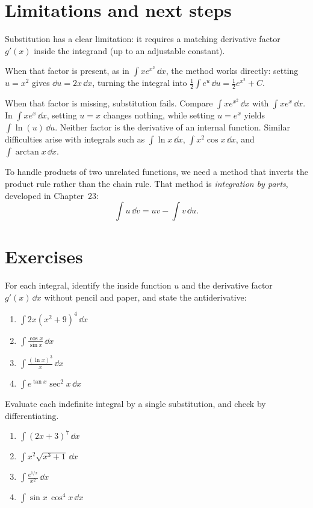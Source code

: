 \section{Limitations and next steps}

\begin{connectionbox}
Substitution has a clear limitation: it requires a matching
derivative factor $g'(x)$ inside the integrand (up to an adjustable constant).

When that factor is present, as in $\int x e^{x^2}\,\dd x$, the method works directly:
setting $u = x^2$ gives $\dd u = 2x\,\dd x$, turning the integral into
$\frac{1}{2}\int e^u\,\dd u = \frac{1}{2}e^{x^2} + C$.

When that factor is missing, substitution fails. Compare $\int x e^{x^2}\,\dd x$ with
$\int x e^x\,\dd x$. In $\int x e^x\,\dd x$, setting $u = x$ changes nothing, while
setting $u = e^x$ yields $\int \ln(u)\,\dd u$. Neither factor is the derivative of an
internal function. Similar difficulties arise with integrals such as $\int \ln x\,\dd x$,
$\int x^2\cos x\,\dd x$, and $\int \arctan x\,\dd x$.

To handle products of two unrelated functions, we need a method that inverts the
product rule rather than the chain rule. That method is \emph{integration by parts},
developed in Chapter~23:
\[
  \int u\,\dd v = uv - \int v\,\dd u.
\]
\end{connectionbox}

\section{Exercises}
\label{ch22:exercises}

\begin{exercise}
For each integral, identify the inside function $u$ and the derivative factor $g'(x)\,\dd x$ without pencil and paper, and state the antiderivative:
\begin{enumerate}
\item $\displaystyle \int 2x\left(x^2+9\right)^4\,\dd x$
\item $\displaystyle \int \frac{\cos x}{\sin x}\,\dd x$
\item $\displaystyle \int \frac{(\ln x)^3}{x}\,\dd x$
\item $\displaystyle \int e^{\tan x}\sec^2 x\,\dd x$
\end{enumerate}
\end{exercise}

\begin{exercise}
Evaluate each indefinite integral by a single substitution, and check by
differentiating.
\begin{enumerate}
\item $\displaystyle \int (2x+3)^7\,\dd x$
\item $\displaystyle \int x^2\sqrt{x^3+1}\,\dd x$
\item $\displaystyle \int \frac{e^{1/x}}{x^2}\,\dd x$
\item $\displaystyle \int \sin x\,\cos^4 x\,\dd x$
\end{enumerate}
\end{exercise}

